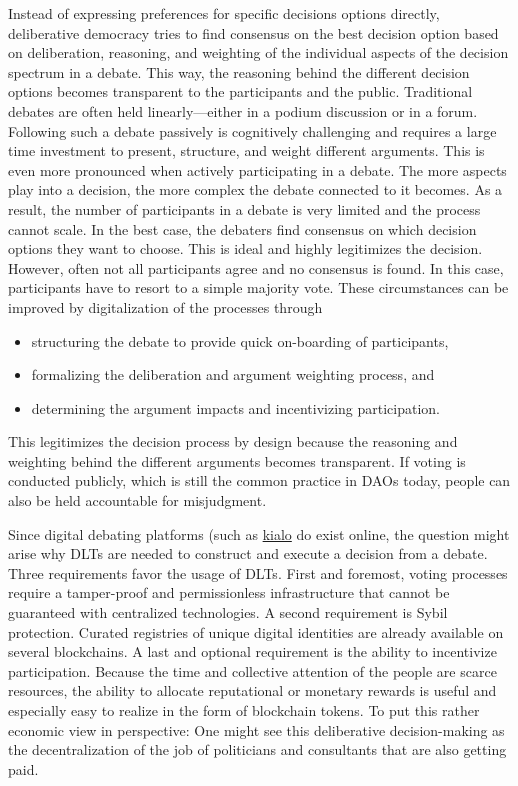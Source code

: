 \documentclass[%
aip,
amsmath,amssymb,
reprint,%
unsortedaddress,
nofootinbib
]{revtex4-2}
\begin{document}
Instead of expressing preferences for specific decisions options directly, 
deliberative democracy tries to find consensus on the best decision option based on deliberation, reasoning, and weighting of the individual aspects of the decision spectrum in a debate.
This way, the reasoning behind the different decision options becomes transparent to the participants and the public.
Traditional debates are often held linearly---either in a podium discussion or in a forum.
Following such a debate passively is cognitively challenging and requires a large time investment
to present, structure, and weight different arguments.
This is even more pronounced when actively participating in a debate.
The more aspects play into a decision, the more complex the debate connected to it becomes.
As a result, the number of participants in a debate is very limited and the process cannot scale.\todo{}
In the best case, the debaters find consensus on which decision options they want to choose.
This is ideal and highly legitimizes the decision.
However, often not all participants agree and no consensus is found.
In this case, participants have to resort to a simple majority vote.
These circumstances can be improved by digitalization of the processes through
\begin{itemize}[noitemsep]
	\item structuring the debate to provide quick on-boarding of participants,
	\item formalizing the deliberation and argument weighting process, and
	\item determining the argument impacts and incentivizing participation. 
\end{itemize}

This legitimizes the decision process by design because the reasoning and weighting behind the different arguments becomes transparent.
If voting is conducted publicly, which is still the common practice in \acp{DAO} today, 
people can also be held accountable for misjudgment.

Since digital debating platforms (such as \href{https://www.kialo.com/}{kialo} do exist online,
the question might arise why \acp{DLT} are needed to construct and execute a decision from a debate.
%
Three requirements favor the usage of \acp{DLT}.
First and foremost, voting processes require a tamper-proof and permissionless infrastructure that cannot be guaranteed with centralized technologies.
A second requirement is Sybil protection. 
Curated registries of unique digital identities are already available on several blockchains. 
A last and optional requirement is the ability to incentivize participation.
Because the time and collective attention of the people are scarce resources,
the ability to allocate reputational or monetary rewards is useful
and especially easy to realize in the form of blockchain tokens.
To put this rather economic view in perspective:
One might see this deliberative decision-making as the decentralization of the job of politicians and consultants that are also getting paid.
\end{document}
